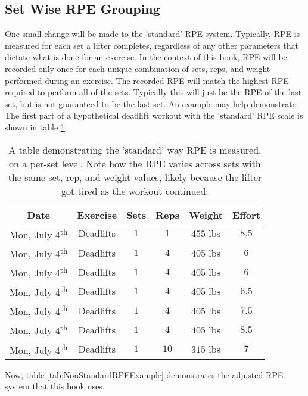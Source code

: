 \subsection{Set Wise RPE Grouping}
\label{sec:SetWiseRPEGrouping}

One small change will be made to the 'standard' RPE system. Typically, RPE is measured for each set a lifter completes, regardless of any other parameters that dictate what is done for an exercise. In the context of this book, RPE will be recorded only once for each unique combination of sets, reps, and weight performed during an exercise. The recorded RPE will match the highest RPE required to perform all of the sets. Typically this will just be the RPE of the last set, but is not guaranteed to be the last set. An example may help demonstrate. The first part of a hypothetical deadlift workout with the 'standard' RPE scale is shown in table \ref{tab:StandardRPEExample}.

\begin{table}[h]
	\centering
	\begin{tabular}{c|c|c|c|c|c}
		Date & Exercise & Sets & Reps & Weight & Effort \\
        \hline
        Mon, July 4\textsuperscript{th} & Deadlifts & $1$ & $1$ & $455$ lbs & $8.5$ \\
        Mon, July 4\textsuperscript{th} & Deadlifts & $1$ & $4$ & $405$ lbs & $6$ \\
        Mon, July 4\textsuperscript{th} & Deadlifts & $1$ & $4$ & $405$ lbs & $6$ \\
        Mon, July 4\textsuperscript{th} & Deadlifts & $1$ & $4$ & $405$ lbs & $6.5$ \\
        Mon, July 4\textsuperscript{th} & Deadlifts & $1$ & $4$ & $405$ lbs & $7.5$ \\
        Mon, July 4\textsuperscript{th} & Deadlifts & $1$ & $4$ & $405$ lbs & $8.5$ \\
        Mon, July 4\textsuperscript{th} & Deadlifts & $1$ & $10$ & $315$ lbs & $7$ \\
	\end{tabular}
	\caption{A table demonstrating the 'standard' way RPE is measured, on a per-set level. Note how the RPE varies across sets with the same set, rep, and weight values, likely because the lifter got tired as the workout continued.}
	\label{tab:StandardRPEExample}
\end{table}

Now, table \ref{tab:NonStandardRPEExample} demonstrates the adjusted RPE system that this book uses.


